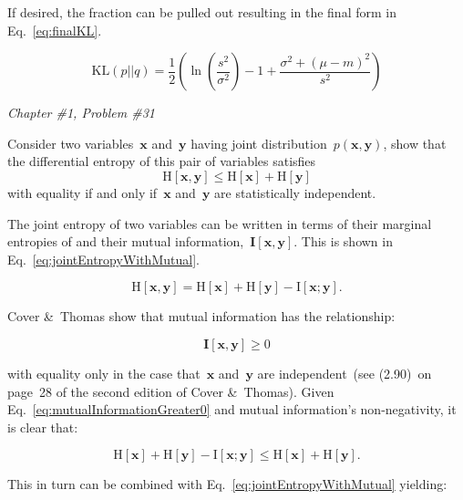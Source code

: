 \documentclass{report}
\newcounter{subProbCount}       %
\newenvironment{problemshell}{
  \par%
  \medskip
  \leftskip=0pt\rightskip=0pt%
}
{
  \par\medskip
  \setcounter{subProbCount}{1} %
}
\newenvironment{problem}[2]
{%
  \begin{problemshell}
    \noindent \textit{Chapter \##1, Problem \##2} \\
    \bfseries  
}
{
  \end{problemshell}
}
\newcommand{\KL}{\textrm{KL}}
\begin{document}
  If desired, the fraction can be pulled out resulting in the final form in Eq.~\eqref{eq:finalKL}.
  
  \begin{equation}
    \KL(p||q) = \frac{1}{2} \left( \ln \left( \frac{s^2}{\sigma^2} \right) - 1 + \frac{\sigma^2 + (\mu - m) ^ 2 }{s^2} \right)
    \label{eq:finalKL}
  \end{equation}

  
  \newpage
  \begin{problem}{1}{31}
    Consider two variables~$\mathbf{x}$ and~$\mathbf{y}$ having joint distribution~$p(\mathbf{x},\mathbf{y})$, show that the differential entropy of this pair of variables satisfies
    \[\textrm{H}[\mathbf{x},\mathbf{y}] \leq \textrm{H}[\mathbf{x}] + \textrm{H}[\mathbf{y}]\]
    with equality if and only if~$\mathbf{x}$ and~$\mathbf{y}$ are statistically independent.
  \end{problem}

  The joint entropy of two variables can be written in terms of their marginal entropies of and their mutual information,~$\mathbf{I}[\mathbf{x},\mathbf{y}]$.  This is shown in Eq.~\eqref{eq:jointEntropyWithMutual}.
  
  \begin{equation}
    \textrm{H}[\mathbf{x},\mathbf{y}] = \textrm{H}[\mathbf{x}] + \textrm{H}[\mathbf{y}] - \textrm{I}[\mathbf{x};\mathbf{y}] \textrm{.}
    \label{eq:jointEntropyWithMutual}
  \end{equation}
  
  Cover \&~Thomas show that mutual information has the relationship:
  
  \begin{equation}
    \mathbf{I}[\mathbf{x},\mathbf{y}] \geq 0
    \label{eq:mutualInformationGreater0}
  \end{equation}
  
  \noindent
  with equality only in the case that~$\mathbf{x}$ and~$\mathbf{y}$ are independent~(see (2.90)~on page~28 of the second edition of Cover \&~Thomas).  Given Eq.~\eqref{eq:mutualInformationGreater0} and mutual information's non-negativity, it is clear that:
  
  \[ \textrm{H}[\mathbf{x}] + \textrm{H}[\mathbf{y}] - \textrm{I}[\mathbf{x};\mathbf{y}] \leq \textrm{H}[\mathbf{x}] + \textrm{H}[\mathbf{y}] \textrm{.} \]
  
  This in turn can be combined with Eq.~\eqref{eq:jointEntropyWithMutual} yielding:
  
\end{document}
